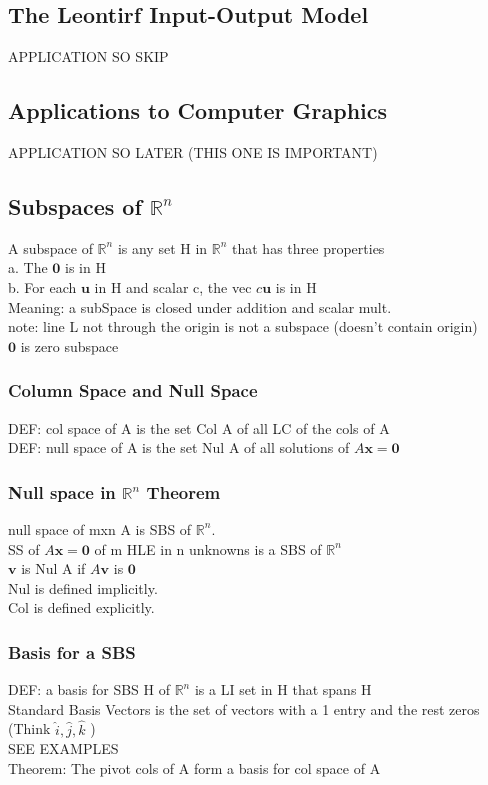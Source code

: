 \documentclass[12pt]{article}
\newcommand{\R}{\mathbb{R}}
\begin{document}
\subsection{The Leontirf Input-Output Model}
    APPLICATION SO SKIP
\subsection{Applications to Computer Graphics}
    APPLICATION SO LATER (THIS ONE IS IMPORTANT)
\subsection{Subspaces of $ \R^n $}
    A subspace of $ \R^n $  is any set H in $\R^ n$ that has three properties\\
    a. The $\bm{0}$ is in H \\
    b. For each $\bm{u}$  in H and scalar c, the vec $c\bm{u}$  is in H \\
    Meaning: a subSpace is closed under addition and scalar mult. \\
    note: line L not through the origin is not a subspace (doesn't 
    contain origin) \\
    $\bm{0}$  is zero subspace  
    \subsubsection{Column Space and Null Space}
        DEF: col space of A is the set Col A of all LC of the cols of A \\
        DEF: null space of A is the set Nul A of all solutions of 
        $ A\bm{x} = \bm{0} $  
    \subsubsection{Null space in $\R^n$  Theorem }
        null space of mxn A is SBS of $\R^n$. \\
        SS of $ A\bm{x} = \bm{0} $  of m HLE in n unknowns is a SBS of $\R^n$ \\
        $\bm{v}$  is Nul A if $A\bm{v}$  is $\bm{0}$  \\
        Nul is defined implicitly.\\
        Col is defined explicitly.
    \subsubsection{Basis for a SBS}
        DEF: a basis for SBS H of $\R^n$ is a LI set in H that spans H\\
        Standard Basis Vectors is the set of vectors with a 1 entry and
        the rest zeros (Think $\hat{i},\hat{j},\hat{k}$ )\\
        SEE EXAMPLES \\
        Theorem: The pivot cols of A form a basis for col space of A
\end{document}
